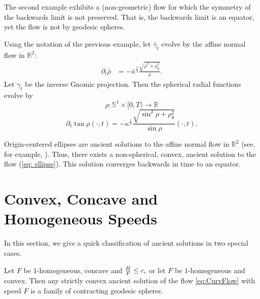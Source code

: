 \documentclass{amsart}
\begin{document}
The second example exhibits a (non-geometric) flow for which the symmetry of the backwards limit is not preserved. That is, the backwards limit is an equator, yet the flow is not by geodesic spheres.

\begin{example}
Using the notation of the previous example, let $\bar{\gamma}_t$ evolve by the affine normal flow in $\mathbb{R}^2:$
\begin{align*}
\partial_t\bar{\rho}&=-\bar{\kappa}^{\frac{1}{3}}\frac{\sqrt{\bar{\rho}^2+\bar{\rho}_{\theta}^2}}{\bar{\rho}}.
\end{align*}
Let \(\gamma_t\) be the inverse Gnomic projection. Then the spherical radial functions evolve by
\[\rho:\mathbb{S}^1\times[0,T)\to \mathbb{R}\]
\begin{equation}\label{eq: ellipse}
\partial_t\tan\rho(\cdot,t)=-\kappa^{\frac{1}{3}} \frac{\sqrt{\sin^2\rho+\rho_{\theta}^2}}{\sin\rho}(\cdot,t).
\end{equation}

Origin-centered ellipses are ancient solutions to the affine normal flow in $\mathbb{R}^2$ (see, for example, \cite{Ivaki:01/2016}). Thus, there exists a non-spherical, convex, ancient solution to the flow (\ref{eq: ellipse}). This solution converges backwards in time to an equator.
\end{example}

\section{Convex, Concave and Homogeneous Speeds}\label{sec:concave_convex_homogeneous}
In this section, we give a quick classification of ancient solutions in two special cases.

\begin{thm}
Let $F$ be $1$-homogeneous, concave and $\frac{H}{F}\leq c,$ or let $F$ be $1$-homogeneous and convex. Then any strictly convex ancient solution of the flow \eqref{eq:CurvFlow} with speed $F$ is a family of contracting geodesic spheres.
\end{thm}
\end{document}
